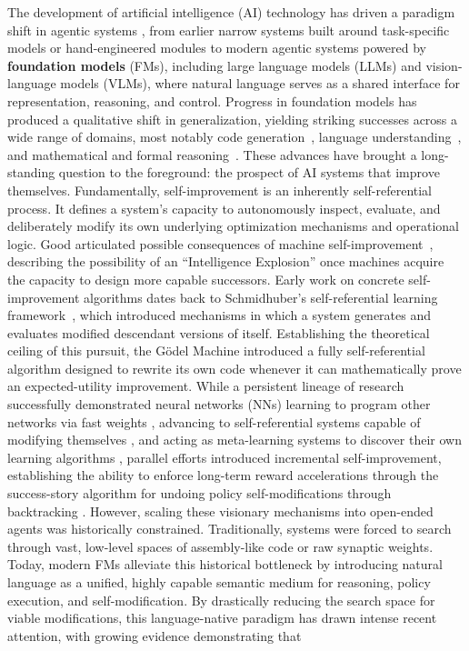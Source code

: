 \documentclass{article}
\begin{document}
The development of artificial intelligence (AI) technology has driven a paradigm shift in agentic systems \citep{shoham1993agent, maes1994agents, wooldridge1995intelligent, yao2022react, Wang_2024}, from earlier narrow systems built around task-specific models or hand-engineered modules to modern agentic systems powered by \textbf{foundation models} (FMs), including large language models (LLMs) and vision-language models (VLMs), where natural language serves as a shared interface for representation, reasoning, and control.
Progress in foundation models has produced a qualitative shift in generalization, yielding striking successes across a wide range of domains, most notably code generation~\citep{chen2021evaluating}, language understanding~\citep{hendrycks2020measuring}, and mathematical and formal reasoning~\citep{wei2022chain}. These advances have brought a long-standing question to the foreground: the prospect of AI systems that improve themselves. Fundamentally, self-improvement is an inherently self-referential process. It defines a system's capacity to autonomously inspect, evaluate, and deliberately modify its own underlying optimization mechanisms and operational logic. Good articulated possible consequences of machine self-improvement~\citep{good1966speculations}, describing the possibility of an ``Intelligence Explosion'' once machines acquire the capacity to design more capable successors. Early work on concrete self-improvement algorithms dates back to Schmidhuber's self-referential learning framework~\citep{schmidhuber1987selfreferential}, which introduced mechanisms in which a system generates and evaluates modified descendant versions of itself. Establishing the theoretical ceiling of this pursuit, the G\"odel Machine \citep{schmidhuber2003godel} introduced a fully self-referential algorithm designed to rewrite its own code whenever it can mathematically prove an expected-utility improvement. While a persistent lineage of research successfully demonstrated neural networks (NNs) learning to program other networks via fast weights \citep{schmidhuber1992learning}, advancing to self-referential systems capable of modifying themselves \citep{schmidhuber1993self, irie2022modern}, and acting as meta-learning systems to discover their own learning algorithms \citep{hochreiter2001learning, schmidhuber2004optimal, kirsch2021meta, kirsch2022eliminating, irie2025metalearningcontinuallearningalgorithms}, parallel efforts introduced incremental self-improvement, establishing the ability to enforce long-term reward accelerations through the success-story algorithm for undoing policy self-modifications through backtracking \citep{Schmidhuber1994OnLH, schmidhuber1996simple, schmidhuber1997shifting}. However, scaling these visionary mechanisms into open-ended agents was historically constrained. Traditionally, systems were forced to search through vast, low-level spaces of assembly-like code or raw synaptic weights. Today, modern FMs alleviate this historical bottleneck by introducing natural language as a unified, highly capable semantic medium for reasoning, policy execution, and self-modification. By drastically reducing the search space for viable modifications, this language-native paradigm has drawn intense recent attention, with growing evidence demonstrating that 
\end{document}
